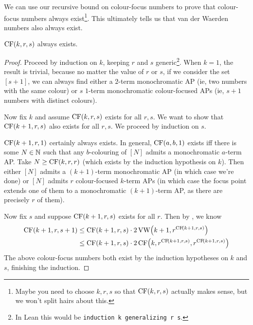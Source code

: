We can use our recursive bound on colour-focus numbers to prove that colour-focus numbers always exist\footnote{Maybe you need to choose $k, r, s$ so that $\operatorname{CF}(k, r, s)$ actually makes sense, but we won't split hairs about this.}. This ultimately tells us that van der Waerden numbers also always exist.

\begin{boxtheorem}
    $\operatorname{CF}(k, r, s)$ always exists.
\end{boxtheorem}
\begin{proof}
    Proceed by induction on $k$, keeping $r$ and $s$ generic\footnote{In Lean this would be \lstinline|induction k generalizing r s|.}. When $k = 1$, the result is trivial, because no matter the value of $r$ or $s$, if we consider the set $[s + 1]$, we can always find either a $2$-term monochromatic AP (ie, two numbers with the same colour) or $s$ $1$-term monochromatic colour-focused APs (ie, $s + 1$ numbers with distinct colours).

    Now fix $k$ and assume $\operatorname{CF}(k, r, s)$ exists for all $r, s$. We want to show that $\operatorname{CF}(k + 1, r, s)$ also exists for all $r, s$. We proceed by induction on $s$.

    $\operatorname{CF}(k + 1, r, 1)$ certainly always exists. In general, $\operatorname{CF}(a, b, 1)$ exists iff there is some $N \in \mathbb{N}$ such that any $b$-colouring of $[N]$ admits a monochromatic $a$-term AP. Take $N \geq \operatorname{CF}(k, r, r)$ (which exists by the induction hypothesis on $k$). Then either $[N]$ admits a $(k + 1)$-term monochromatic AP (in which case we're done) or $[N]$ admits $r$ colour-focused $k$-term APs (in which case the focus point extends one of them to a monochromatic $(k + 1)$-term AP, as there are precisely $r$ of them).

    Now fix $s$ and suppose $\operatorname{CF}(k + 1, r, s)$ exists for all $r$. Then by , we know
    \begin{align*}
        \CF\of{k + 1, r, s + 1}
        &\leq \CF\of{k + 1, r, s} \cdot 2 \VW\of{k + 1, r^{\CF\of{k + 1, r, s}}} \\
        &\leq \CF\of{k + 1, r, s} \cdot 2 \CF\of{k, r^{\CF\of{k + 1, r, s}}, r^{\CF\of{k + 1, r, s}}}
    \end{align*}
    The above colour-focus numbers both exist by the induction hypotheses on $k$ and $s$, finishing the induction.
\end{proof}

